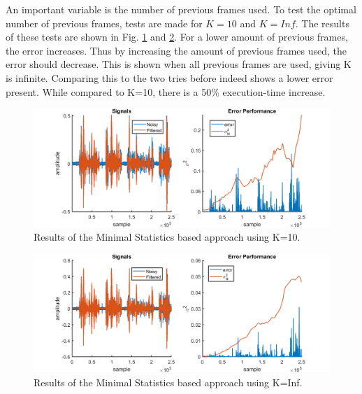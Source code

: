 An important variable is the number of previous frames used. To test the optimal number of previous frames, tests are made for $K=10$ and $K=Inf$. The results of these tests are shown in Fig. \ref{fig:K10} and \ref{fig:KInf}. For a lower amount of previous frames, the error increases. Thus by increasing the amount of previous frames used, the error should decrease. This is shown when all previous frames are used, giving K is infinite. Comparing this to the two tries before indeed shows a lower error present. While compared to K=10, there is a 50\% execution-time increase.

\begin{figure}[h]
  \centering
  \includegraphics[width=\textwidth]{images/MeanK10.png}
  \caption{Results of the Minimal Statistics based approach using K=10.}
  \label{fig:K10}
\end{figure}

\begin{figure}[h]
  \centering
  \includegraphics[width=\textwidth]{images/MeanKinf.png}
  \caption{Results of the Minimal Statistics based approach using K=Inf.}
  \label{fig:KInf}
\end{figure}

\clearpage
